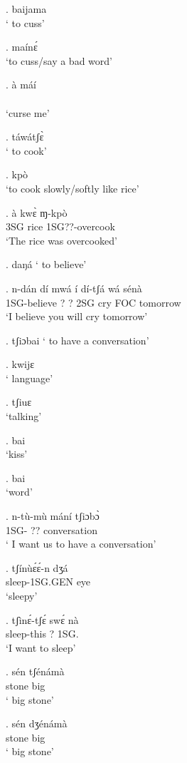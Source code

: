 \documentclass{assets/fieldnotes}
\begin{document}
\ex. baijama\\
` to cuss'

\ex. maínɛ́\\
`to cuss/say a bad word'

\exg. à máí\\
\\
`curse me'

\ex. táwátʃɛ̀\\
` to cook'

\ex. kpò\\
`to cook slowly/softly like rice'

\exg. à kwɛ̀ ɱ-kpò \\
3SG rice  1SG??-overcook\\
`The rice was overcooked'

\ex. daŋá
` to believe'

\exg. n-dán dí mwá í dí-tʃá wá sénà\\
1SG-believe  ?  ?  2SG  cry FOC  tomorrow\\
`I believe you will cry tomorrow'

\ex. tʃiɔbai
` to have a conversation'

\ex. kwijɛ\\
` language'

\ex. tʃiuɛ\\
`talking'

\ex. bai\\
`kiss'

\ex. bai\\
`word'

\exg. n-tù-mù mání tʃiɔbɔ̀\\
1SG- ??            conversation\\
` I want us to have a conversation'

\exg. tʃínùɛ́ɛ́-n dʒá\\
sleep-1SG.GEN eye\\
`sleepy'

\exg. tʃìnɛ́-tʃɛ́ swɛ́ nà\\
sleep-this ?    1SG.    \\
`I want to sleep'

\exg. sén tʃénámà\\
stone big\\
` big stone'

\exg. sén dʒénámà \\
 stone big\\
` big stone'
\end{document}
